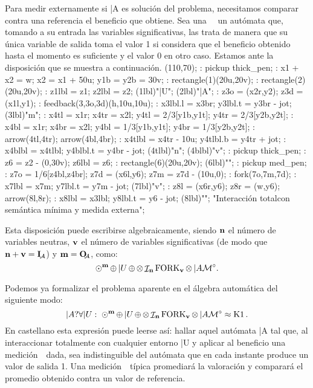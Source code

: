 Para medir externamente si |A es solución del problema, necesitamos
comparar contra una referencia el beneficio que obtiene.  Sea una
~\Metric\ un autómata que, tomando a su entrada
las variables significativas, las trata de manera que su única variable de
salida toma el valor 1 si considera que el beneficio obtenido hasta el
momento es suficiente y el valor 0 en otro caso.  Estamos ante la
disposición que se muestra a continuación.
\MTbeginfigure(110,70);
 \MT: pickup thick_pen;
 \MT: x1 + x2 = w; x2 = x1 + 50u; y1b = y2b = 30v;
 \MT: rectangle(1)(20u,20v); %
 \MT: rectangle(2)(20u,20v); %
 \MT: z1lbl = z1; z2lbl = z2;
 \MTlabel(1lbl)"|U";
 \MTlabel(2lbl)"|A";
 \MT: z3o = (x2r,y2); z3d = (x1l,y1);
 \MT: feedback(3,3o,3d)(h,10u,10u);
 \MT: x3lbl.l = x3br; y3lbl.t = y3br - jot;
 \MTlabel(3lbl)"\no m";
 \MT: x4tl = x1r; x4tr = x2l; y4tl = 2/3[y1b,y1t]; y4tr = 2/3[y2b,y2t];
 \MT: x4bl = x1r; x4br = x2l; y4bl = 1/3[y1b,y1t]; y4br = 1/3[y2b,y2t];
 \MT: arrow(4tl,4tr); arrow(4bl,4br); %
 \MT: x4tlbl = x4tr - 10u; y4tlbl.b = y4tr + jot;
 \MT: x4blbl = x4tlbl; y4blbl.t = y4br - jot;
 \MTlabel(4tlbl)"\no n"; \MTlabel(4blbl)"\no v";
 \MT: pickup thick_pen;
 \MT: z6 = z2 - (0,30v); z6lbl = z6;
 \MT: rectangle(6)(20u,20v); %
 \MTlabel(6lbl)"\Metric";
 \MT: pickup med_pen;
 \MT: z7o = 1/6[z4bl,z4br]; z7d = (x6l,y6); z7m = z7d - (10u,0);
 \MT: fork(7o,7m,7d);
 \MT: x7lbl = x7m; y7lbl.t = y7m - jot;
 \MTlabel(7lbl)"\no v";
 \MT: z8l = (x6r,y6); z8r = (w,y6); arrow(8l,8r);
 \MT: x8lbl = x3lbl; y8lbl.t = y6 - jot;
 \MTlabel(8lbl)"";
\MTendfigure"Interacción total\cr con semántica mínima\cr
 y medida externa";

Esta disposición puede escribirse algebraicamente, siendo ${\bf n}$ el
número de variables neutras, ${\bf v}$ el número de variables
significativas (de modo que $\no n + \no v = \inpA$) y $\no m = \outA$,
como:
 $$\fdb^{\no m} \srl |U \srl \prl \ID_{\no n} \FORK_{\no v} \prl |A
   \Metric.$$

Podemos ya formalizar el problema aparente en el álgebra automática del
siguiente modo:
 $$|A? \forall |U : \; \fdb^{\no m} \srl |U \srl
   \prl \ID_{\no n} \FORK_{\no v} \prl |A \Metric \nodis \ONE.$$
En castellano esta expresión puede leerse así:  hallar aquel autómata
|A tal que, al interaccionar totalmente con cualquier entorno |U y aplicar
al beneficio una medición~\Metric\ dada, sea indistinguible del
autómata que en cada instante produce un valor de salida 1.
Una medición~\Metric\ típica promediará la valoración y
comparará el promedio obtenido contra un valor de referencia.


